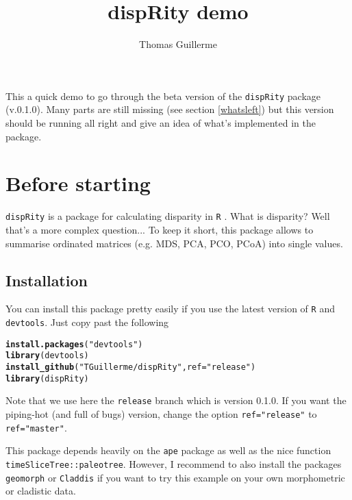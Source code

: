 \documentclass{article}\usepackage[]{graphicx}\usepackage[]{color}
\makeatletter
\newcommand{\hlstr}[1]{\textcolor[rgb]{0.192,0.494,0.8}{#1}}%
\newcommand{\hlstd}[1]{\textcolor[rgb]{0.345,0.345,0.345}{#1}}%
\newcommand{\hlkwc}[1]{\textcolor[rgb]{0.333,0.667,0.333}{#1}}%
\newcommand{\hlkwd}[1]{\textcolor[rgb]{0.737,0.353,0.396}{\textbf{#1}}}%
\newenvironment{kframe}{%
 \def\at@end@of@kframe{}%
 \ifinner\ifhmode%
  \def\at@end@of@kframe{\end{minipage}}%
  \begin{minipage}{\columnwidth}%
 \fi\fi%
 \def\FrameCommand##1{\hskip\@totalleftmargin \hskip-\fboxsep
 \colorbox{shadecolor}{##1}\hskip-\fboxsep
     \hskip-\linewidth \hskip-\@totalleftmargin \hskip\columnwidth}%
 \MakeFramed {\advance\hsize-\width
   \@totalleftmargin\z@ \linewidth\hsize
   \@setminipage}}%
 {\par\unskip\endMakeFramed%
 \at@end@of@kframe}
\newenvironment{knitrout}{}{} %
\newcommand{\dispRity}{\texttt{dispRity} }
\newcommand{\R}{\texttt{R} }
\makeatother
\begin{document}
\title{dispRity demo}


\author{Thomas Guillerme}

\maketitle

This a quick demo to go through the beta version of the \dispRity package (v.0.1.0).
Many parts are still missing (see section \ref{whatsleft}) but this version should be running all right and give an idea of what's implemented in the package.

\section{Before starting}

\dispRity is a package for calculating disparity in \R.
What is disparity? Well that's a more complex question...
To keep it short, this package allows to summarise ordinated matrices (e.g. MDS, PCA, PCO, PCoA) into single values.

\subsection{Installation}
You can install this package pretty easily if you use the latest version of \R and \texttt{devtools}.
Just copy past the following
\begin{knitrout}
\color{fgcolor}\begin{kframe}
\begin{alltt}
\hlkwd{install.packages}\hlstd{(}\hlstr{"devtools"}\hlstd{)}
\hlkwd{library}\hlstd{(devtools)}
\hlkwd{install_github}\hlstd{(}\hlstr{"TGuillerme/dispRity"}\hlstd{,} \hlkwc{ref}\hlstd{=}\hlstr{"release"}\hlstd{)}
\hlkwd{library}\hlstd{(dispRity)}
\end{alltt}
\end{kframe}
\end{knitrout}

Note that we use here the \texttt{release} branch which is version 0.1.0.
If you want the piping-hot (and full of bugs) version, change the option \texttt{ref="release"} to \texttt{ref="master"}.

This package depends heavily on the \texttt{ape} package as well as the nice function \texttt{timeSliceTree::paleotree}.
However, I recommend to also install the packages \texttt{geomorph} or \texttt{Claddis} if you want to try this example on your own morphometric or cladistic data.
\end{document}
